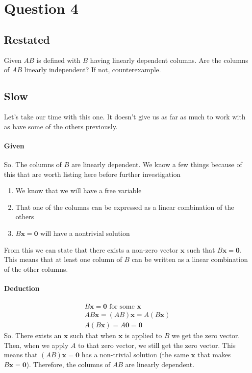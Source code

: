 \documentclass{article}
\begin{document}
    \section{Question 4}
        \subsection{Restated}
            Given $AB$ is defined with $B$ having linearly
            dependent columns. Are the columns of $AB$
            linearly independent? If not, counterexample.
        \subsection{Slow}
            Let's take our time with this one. It doesn't give us as far as
            much to work with as have some of the others previously.
            \paragraph{Given}
                So. The columns of $B$ are linearly dependent.
                We know a few things because of this that are worth listing here before further investigation
                \begin{enumerate}
                    \item We know that we will have a free variable
                    \item That one of the columns can be expressed as a linear combination of the others
                    \item $B\mathbf{x} = \mathbf{0}$ will have a nontrivial solution
                \end{enumerate}
                    From this we can state that there exists a non-zero vector $\mathbf{x}$ such that $B\mathbf{x} = \mathbf{0}$. 
                    This means that at least one column of $B$ can be written as a linear combination of the other columns.
            \paragraph{Deduction}
                \begin{gather*}
                    B\mathbf{x}=\mathbf{0}\text{ for some }\mathbf{x} \\
                    AB\mathbf{x}=(AB)\mathbf{x}=A(B\mathbf{x}) \\
                    A(B\mathbf{x})=A\mathbf{0}=\mathbf{0} 
                \end{gather*}
                So. There exists an $\mathbf{x}$ such that when
                $\mathbf{x}$ is applied to $B$ we get the zero vector. Then, when we apply $A$ to that zero vector, we still get the zero vector.
                This means that $(AB)\mathbf{x} = \mathbf{0}$ has a non-trivial solution (the same $\mathbf{x}$ that makes $B\mathbf{x}=\mathbf{0}$).
                Therefore, the columns of $AB$ are linearly dependent.
\end{document}
